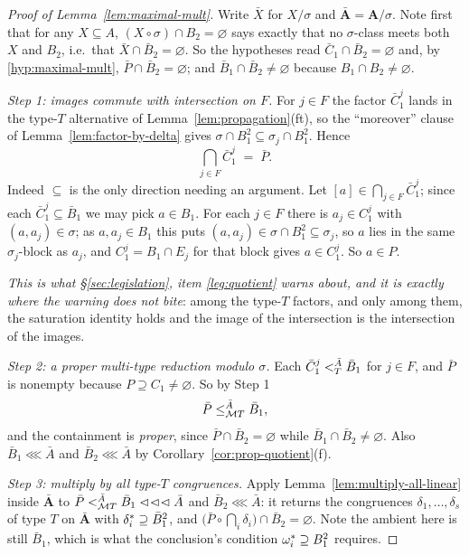 \begin{proof}[Proof of Lemma~\ref{lem:maximal-mult}]
Write $\bar X$ for $X/\sigma$ and $\bar{\mathbf A}=\mathbf A/\sigma$. Note
first that for any $X\subseteq A$, $(X\circ\sigma)\cap B_{2}=\varnothing$ says
exactly that no $\sigma$-class meets both $X$ and $B_{2}$, i.e.\ that
$\bar X\cap\bar B_{2}=\varnothing$. So the hypotheses read
$\bar C_{1}\cap\bar B_{2}=\varnothing$ and, by
\ref{hyp:maximal-mult}, $\bar P\cap\bar B_{2}=\varnothing$; and
$\bar B_{1}\cap\bar B_{2}\neq\varnothing$ because
$B_{1}\cap B_{2}\neq\varnothing$.

\emph{Step 1: images commute with intersection on $F$.} For $j\in F$ the factor
$\bar C_{1}^{j}$ lands in the type-$T$ alternative of
Lemma~\ref{lem:propagation}(ft), so the ``moreover'' clause of
Lemma~\ref{lem:factor-by-delta} gives
$\sigma\cap B_{1}^{2}\subseteq\sigma_{j}\cap B_{1}^{2}$. Hence
\[
  \bigcap_{j\in F}\bar C_{1}^{j}\;=\;\bar P .
\]
Indeed $\subseteq$ is the only direction needing an argument. Let
$[a]\in\bigcap_{j\in F}\bar C_{1}^{j}$; since each
$\bar C_{1}^{j}\subseteq\bar B_{1}$ we may pick $a\in B_{1}$. For each
$j\in F$ there is $a_{j}\in C_{1}^{j}$ with $(a,a_{j})\in\sigma$; as
$a,a_{j}\in B_{1}$ this puts $(a,a_{j})\in\sigma\cap B_{1}^{2}\subseteq
\sigma_{j}$, so $a$ lies in the same $\sigma_{j}$-block as $a_{j}$, and
$C_{1}^{j}=B_{1}\cap E_{j}$ for that block gives $a\in C_{1}^{j}$. So
$a\in P$.

\emph{This is what \S\ref{sec:legislation}, item \ref{leg:quotient} warns
about, and it is exactly where the warning does not bite}: among the type-$T$
factors, and only among them, the saturation identity holds and the image of
the intersection is the intersection of the images.

\emph{Step 2: a proper multi-type reduction modulo $\sigma$.} Each
$\bar C_{1}^{j}\subt[\bar A]{T}\bar B_{1}$ for $j\in F$, and $\bar P$ is
nonempty because $P\supseteq C_{1}\neq\varnothing$. So by Step 1
\[
  \bar P\subte[\bar A]{\MT T}\bar B_{1},
\]
and the containment is \emph{proper}, since
$\bar P\cap\bar B_{2}=\varnothing$ while
$\bar B_{1}\cap\bar B_{2}\neq\varnothing$. Also $\bar B_{1}\lll\bar A$ and
$\bar B_{2}\lll\bar A$ by Corollary~\ref{cor:prop-quotient}(f).

\emph{Step 3: multiply by all type-$T$ congruences.} Apply
Lemma~\ref{lem:multiply-all-linear} inside $\bar{\mathbf A}$ to
$\bar P\subt[\bar A]{\MT T}\bar B_{1}\lll\bar A$ and
$\bar B_{2}\lll\bar A$: it returns the congruences
$\delta_{1},\dots,\delta_{s}$ of type $T$ on $\bar{\mathbf A}$ with
$\cover{\delta_{i}}\supseteq\bar B_{1}^{2}$, and
$\bigl(\bar P\circ\bigcap_{i}\delta_{i}\bigr)\cap\bar B_{2}=\varnothing$.
Note the ambient here is still $\bar B_{1}$, which is what the conclusion's
condition $\cover{\omega_{i}}\supseteq B_{1}^{2}$ requires.


\end{proof}
